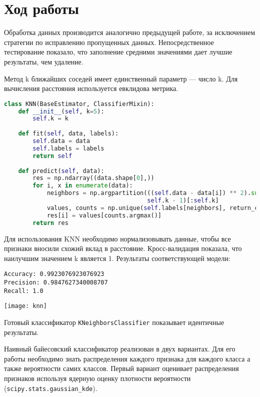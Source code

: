 \section{Ход работы}

Обработка данных производится аналогично предыдущей работе, за исключением стратегии по исправлению пропущенных данных. Непосредственное тестирование показало, что заполнение средними значениями дает лучшие результаты, чем удаление.

Метод k ближайших соседей имеет единственный параметр --- число k. Для вычисления расстояния используется евклидова метрика.

\begin{lstlisting}[language=python, keepspaces=true]
class KNN(BaseEstimator, ClassifierMixin):
    def __init__(self, k=5):
        self.k = k
    
    def fit(self, data, labels):
        self.data = data
        self.labels = labels
        return self
    
    def predict(self, data):
        res = np.ndarray((data.shape[0],))
        for i, x in enumerate(data):
            neighbors = np.argpartition(((self.data - data[i]) ** 2).sum(axis=1), 
                                        self.k - 1)[:self.k]
            values, counts = np.unique(self.labels[neighbors], return_counts=True)
            res[i] = values[counts.argmax()]
        return res
\end{lstlisting}

Для использования KNN необходимо нормализовывать данные, чтобы все признаки вносили схожий вклад в расстояние. Кросс-валидация показала, что наилучшим значением k является 1. Результаты соответствующей модели:

\begin{lstlisting}[frame=none, numbers=none]
Accuracy: 0.9923076923076923
Precision: 0.9847627340008707
Recall: 1.0
\end{lstlisting}
\texttt{[image: knn]}

Готовый классификатор {\tt KNeighborsClassifier} показывает идентичные результаты.

Наивный байесовский классификатор реализован в двух вариантах. Для его работы необходимо знать распределения каждого признака для каждого класса а также вероятности самих классов. Первый вариант оценивает распределения признаков используя ядерную оценку плотности вероятности ({\tt scipy.stats.gaussian\_kde}).

